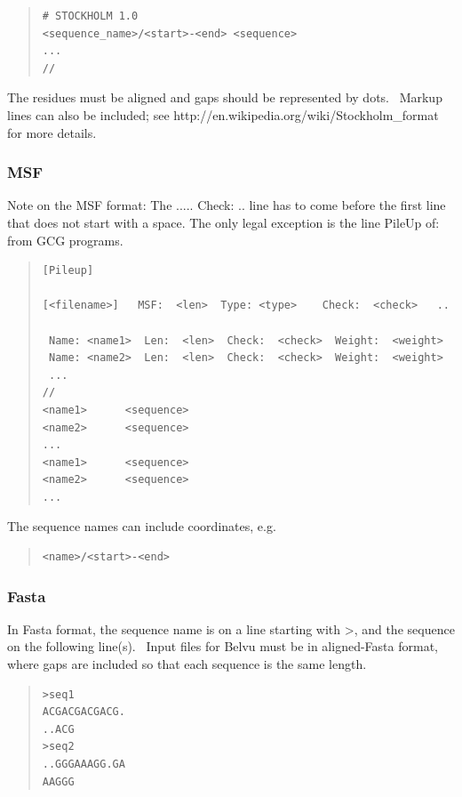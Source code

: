 \documentclass[letterpaper]{article}
\begin{document}
\begin{quote}
\begin{verbatim}
# STOCKHOLM 1.0
<sequence_name>/<start>-<end> <sequence>
...
//
\end{verbatim}
\end{quote}

The residues must be aligned and gaps should be represented by dots. \ Markup lines can also be included; see http://en.wikipedia.org/wiki/Stockholm\_format for more details.

\subsubsection[MSF]{MSF}
Note on the MSF format: The {\textquotedbl}..... Check: ..{\textquotedbl} line has to come before the first line that does not start with a space. The only legal exception is the line {\textquotedbl}PileUp of:{\textquotedbl} from GCG programs.

\begin{quote}
\begin{verbatim}
[Pileup]

[<filename>]   MSF:  <len>  Type: <type>    Check:  <check>   ..

 Name: <name1>  Len:  <len>  Check:  <check>  Weight:  <weight>
 Name: <name2>  Len:  <len>  Check:  <check>  Weight:  <weight>
 ...
//
<name1>      <sequence>
<name2>      <sequence>
...
<name1>      <sequence>
<name2>      <sequence>
...
\end{verbatim}
\end{quote}

The sequence names can include coordinates, e.g.

\begin{quote}
\begin{verbatim}
<name>/<start>-<end>
\end{verbatim}
\end{quote}

\subsubsection[Fasta]{Fasta}
In Fasta format, the sequence name is on a line starting with {\textasciigrave}{\textgreater}{\textasciigrave}, and the sequence on the following line(s). \ Input files for Belvu must be in aligned-Fasta format, where gaps are included so that each sequence is the same length.

\begin{quote}
\begin{verbatim}
>seq1
ACGACGACGACG.
..ACG
>seq2
..GGGAAAGG.GA
AAGGG
\end{verbatim}
\end{quote}
\end{document}
